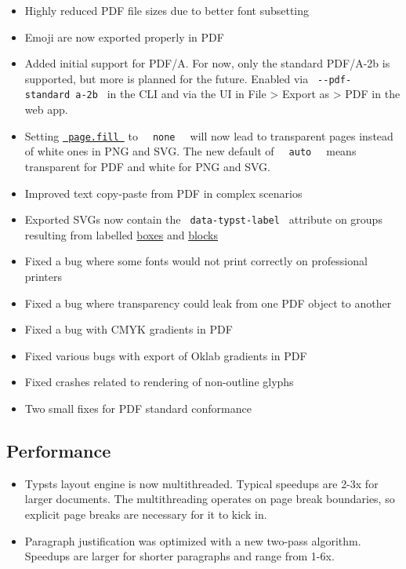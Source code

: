 \begin{itemize}
\tightlist
\item
  Highly reduced PDF file sizes due to better font subsetting
\item
  Emoji are now exported properly in PDF
\item
  Added initial support for PDF/A. For now, only the standard PDF/A-2b
  is supported, but more is planned for the future. Enabled via
  \texttt{\ -\/-pdf-standard\ a-2b\ } in the CLI and via the UI in File
  \textgreater{} Export as \textgreater{} PDF in the web app.
\item
  Setting
  \href{/docs/reference/layout/page/\#parameters-fill}{\texttt{\ page.fill\ }}
  to \texttt{\ }{\texttt{\ none\ }}\texttt{\ } will now lead to
  transparent pages instead of white ones in PNG and SVG. The new
  default of \texttt{\ }{\texttt{\ auto\ }}\texttt{\ } means transparent
  for PDF and white for PNG and SVG.
\item
  Improved text copy-paste from PDF in complex scenarios
\item
  Exported SVGs now contain the \texttt{\ data-typst-label\ } attribute
  on groups resulting from labelled
  \href{/docs/reference/layout/box/}{boxes} and
  \href{/docs/reference/layout/block/}{blocks}
\item
  Fixed a bug where some fonts would not print correctly on professional
  printers
\item
  Fixed a bug where transparency could leak from one PDF object to
  another
\item
  Fixed a bug with CMYK gradients in PDF
\item
  Fixed various bugs with export of Oklab gradients in PDF
\item
  Fixed crashes related to rendering of non-outline glyphs
\item
  Two small fixes for PDF standard conformance
\end{itemize}

\subsection{Performance}\label{performance}

\begin{itemize}
\tightlist
\item
  Typst\textquotesingle s layout engine is now multithreaded. Typical
  speedups are 2-3x for larger documents. The multithreading operates on
  page break boundaries, so explicit page breaks are necessary for it to
  kick in.
\item
  Paragraph justification was optimized with a new two-pass algorithm.
  Speedups are larger for shorter paragraphs and range from 1-6x.
\end{itemize}

